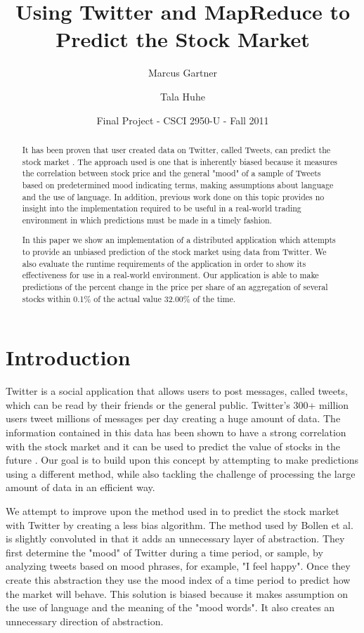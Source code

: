 \documentclass[twocolumn]{article}
\begin{document}
\title{Using Twitter and MapReduce to Predict the Stock Market}
\author{Marcus Gartner \and Tala Huhe}
\date{Final Project - CSCI 2950-U - Fall 2011}
\maketitle

\begin{abstract}
\noindent
It has been proven that user created data on Twitter, called Tweets, can predict the stock market \cite{bollen}. The approach used is one that is inherently biased because it measures the correlation between stock price and the general "mood" of a sample of Tweets based on predetermined mood indicating terms, making assumptions about language and the use of language. In addition, previous work done on this topic provides no insight into the implementation required to be useful in a real-world trading environment in which predictions must be made in a timely fashion.

In this paper we show an implementation of a distributed application which attempts to provide an unbiased prediction of the stock market using data from Twitter. We also evaluate the runtime requirements of the application in order to show its effectiveness for use in a real-world environment. Our application is able to make predictions of the percent change in the price per share of an aggregation of several stocks within 0.1\% of the actual value 32.00\% of the time.
\end{abstract}

\section{Introduction}
Twitter is a social application that allows users to post messages, called tweets, which can be read by their friends or the general public. Twitter's 300+ million users tweet millions of messages per day creating a huge amount of data. The information contained in this data has been shown to have a strong correlation with the stock market and it can be used to predict the value of stocks in the future \cite{bollen}. Our goal is to build upon this concept by attempting to make predictions using a different method, while also tackling the challenge of processing the large amount of data in an efficient way.

We attempt to improve upon the method used in \cite{bollen} to predict the stock market with Twitter by creating a less bias algorithm. The method used by Bollen et al. is slightly convoluted in that it adds an unnecessary layer of abstraction. They first determine the "mood" of Twitter during a time period, or sample, by analyzing tweets based on mood phrases, for example, "I feel happy". Once they create this abstraction they use the mood index of a time period to predict how the market will behave. This solution is biased because it makes assumption on the use of language and the meaning of the "mood words". It also creates an unnecessary direction of abstraction.
\end{document}
